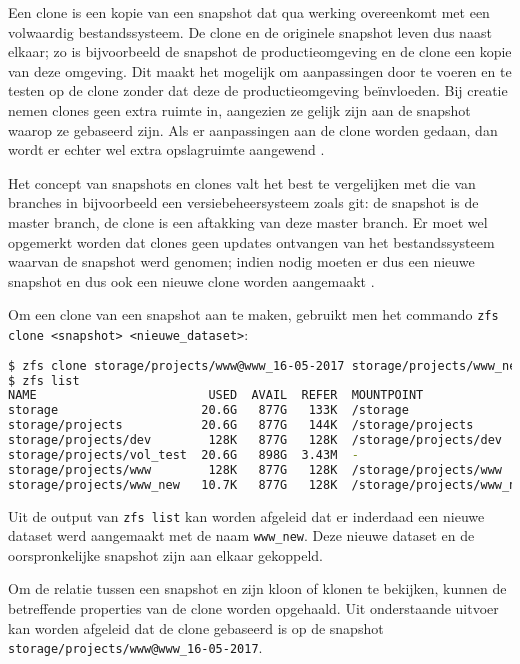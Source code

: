 Een clone is een kopie van een snapshot dat qua werking overeenkomt met een volwaardig bestandssysteem. De clone en de originele snapshot leven dus naast elkaar; zo is bijvoorbeeld de snapshot de productieomgeving en de clone een kopie van deze omgeving. Dit maakt het mogelijk om aanpassingen door te voeren en te testen op de clone zonder dat deze de productieomgeving beïnvloeden. Bij creatie nemen clones geen extra ruimte in, aangezien ze gelijk zijn aan de snapshot waarop ze gebaseerd zijn. Als er aanpassingen aan de clone worden gedaan, dan wordt er echter wel extra opslagruimte aangewend \autocite{Lucas2015}.

Het concept van snapshots en clones valt het best te vergelijken met die van branches in bijvoorbeeld een versiebeheersysteem zoals git: de snapshot is de master branch, de clone is een aftakking van deze master branch. Er moet wel opgemerkt worden dat clones geen updates ontvangen van het bestandssysteem waarvan de snapshot werd genomen; indien nodig moeten er dus een nieuwe snapshot en dus ook een nieuwe clone worden aangemaakt \autocite{Lucas2015}.

Om een clone van een snapshot aan te maken, gebruikt men het commando \texttt{zfs clone <snapshot> <nieuwe\_dataset>}:

\begin{lstlisting}[language=bash,style=command_style] 
$ zfs clone storage/projects/www@www_16-05-2017 storage/projects/www_new
$ zfs list
NAME                        USED  AVAIL  REFER  MOUNTPOINT
storage                    20.6G   877G   133K  /storage
storage/projects           20.6G   877G   144K  /storage/projects
storage/projects/dev        128K   877G   128K  /storage/projects/dev
storage/projects/vol_test  20.6G   898G  3.43M  -
storage/projects/www        128K   877G   128K  /storage/projects/www
storage/projects/www_new   10.7K   877G   128K  /storage/projects/www_new
\end{lstlisting}

Uit de output van \texttt{zfs list} kan worden afgeleid dat er inderdaad een nieuwe dataset werd aangemaakt met de naam \texttt{www\_new}. Deze nieuwe dataset en de oorspronkelijke snapshot zijn aan elkaar gekoppeld. 

Om de relatie tussen een snapshot en zijn kloon of klonen te bekijken, kunnen de betreffende properties van de clone worden opgehaald. Uit onderstaande uitvoer kan worden afgeleid dat de clone gebaseerd is op de snapshot \texttt{storage/projects/www@www\_16-05-2017}.

